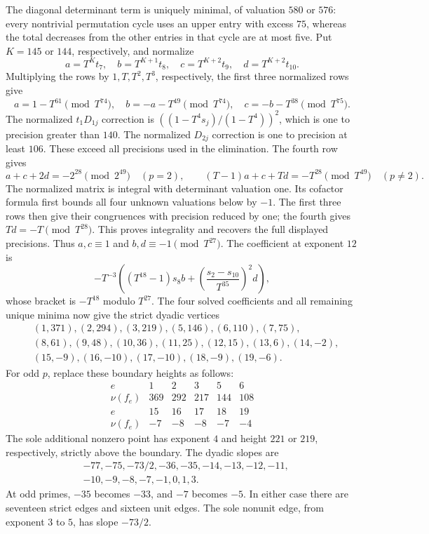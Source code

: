 \documentclass[11pt]{article}
\theoremstyle{remark}\newtheorem{remark}[theorem]{Remark}
\newcommand{\val}{\nu}
\begin{document}
The diagonal determinant term is uniquely minimal, of valuation
$580$ or $576$: every nontrivial permutation cycle uses an upper
entry with excess $75$, whereas the total decreases from the other
entries in that cycle are at most five. Put $K=145$ or $144$, respectively, and normalize
\[
 a=T^Kt_7,\quad b=T^{K+1}t_8,\quad
 c=T^{K+2}t_9,\quad d=T^{K+2}t_{10}.
\]
Multiplying the rows by $1,T,T^2,T^3$, respectively, the first
three normalized rows give
\[
 a=1-T^{61}\pmod {T^{74}},\quad
 b=-a-T^{49}\pmod {T^{74}},\quad
 c=-b-T^{38}\pmod {T^{75}}.
\]
The normalized $t_1D_{1j}$ correction is
$((1-T^4s_j)/(1-T^4))^2$, which is one to precision greater than
$140$. The normalized $D_{2j}$ correction is one to precision at
least $106$. These exceed all precisions used in the elimination.
The fourth row gives
\[
 a+c+2d=-2^{28}\pmod {2^{49}}\quad(p=2),
 \qquad
 (T-1)a+c+Td=-T^{28}\pmod {T^{49}}\quad(p\ne2).
\]
The normalized matrix is integral with determinant valuation one.
Its cofactor formula first bounds all four unknown valuations below by
$-1$. The first three rows then give their congruences with precision
reduced by one; the fourth gives $Td=-T\pmod {T^{28}}$. This proves
integrality and recovers the full displayed precisions.
Thus $a,c\equiv1$ and $b,d\equiv-1\pmod {T^{27}}$.
The coefficient at exponent $12$ is
\[
 -T^{-3}\left((T^{18}-1)s_8b+
       \left(\frac{s_2-s_{10}}{T^{35}}\right)^2d\right),
\]
whose bracket is $-T^{18}$ modulo $T^{27}$.
The four solved coefficients and all remaining unique minima now give
the strict dyadic vertices
\[
\begin{split}
 &(1,371),(2,294),(3,219),(5,146),(6,110),(7,75),\\
 &(8,61),(9,48),(10,36),(11,25),(12,15),(13,6),(14,-2),\\
 &(15,-9),(16,-10),(17,-10),(18,-9),(19,-6).
\end{split}
\]
For odd $p$, replace these boundary heights as follows:
\[
\begin{array}{c|rrrrr}
e&1&2&3&5&6\\ \hline
\val(f_e)&369&292&217&144&108\\
e&15&16&17&18&19\\ \hline
\val(f_e)&-7&-8&-8&-7&-4
\end{array}
\]
The sole additional nonzero point has exponent $4$ and height
$221$ or $219$, respectively, strictly above the boundary.
The dyadic slopes are
\[
\begin{split}
&-77,-75,-73/2,-36,-35,-14,-13,-12,-11,\\
&-10,-9,-8,-7,-1,0,1,3.
\end{split}
\]
At odd primes, $-35$ becomes $-33$, and $-7$ becomes $-5$.
In either case there are seventeen strict edges and sixteen unit
edges. The sole nonunit edge, from exponent $3$ to $5$, has slope
$-73/2$.
\end{document}
